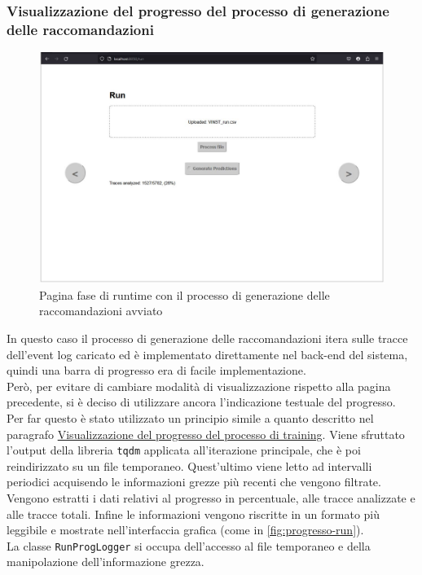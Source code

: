 \subsubsection{Visualizzazione del progresso del processo di generazione delle raccomandazioni}

\begin{figure}[H] 
    \centering 
    \includegraphics[width=0.7\columnwidth]{immagini/pag-run-recommendation-generation.jpg} 
    \caption{Pagina fase di runtime con il processo di generazione delle raccomandazioni avviato}
    \label{fig:progresso-run}
\end{figure}

In questo caso il processo di generazione delle raccomandazioni itera sulle tracce dell'event log caricato ed è implementato direttamente nel back-end del sistema, quindi una barra di progresso era di facile implementazione.
\\
Però, per evitare di cambiare modalità di visualizzazione rispetto alla pagina precedente, si è deciso di utilizzare ancora l'indicazione testuale del progresso. 
\\
Per far questo è stato utilizzato un principio simile a quanto descritto nel paragrafo \hyperref[subsubsec:progress-train]{Visualizzazione del progresso del processo di training}. Viene sfruttato l'output della libreria \texttt{tqdm} \cite{site:tqdm} applicata all'iterazione principale, che è poi reindirizzato su un file temporaneo. Quest'ultimo viene letto ad intervalli periodici acquisendo le informazioni grezze più recenti che vengono filtrate. Vengono estratti i dati relativi al progresso in percentuale, alle tracce analizzate e alle tracce totali. Infine le informazioni vengono riscritte in un formato più leggibile e mostrate nell'interfaccia grafica (come in \autoref{fig:progresso-run}). 
\\
La classe \texttt{RunProgLogger} si occupa dell'accesso al file temporaneo e della manipolazione dell'informazione grezza.


